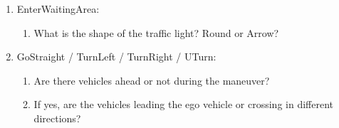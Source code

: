 \documentclass[lettersize,journal]{IEEEtran}
\begin{document}
\begin{enumerate}
    \item EnterWaitingArea:
    \begin{enumerate}
        \item What is the shape of the traffic light? Round or Arrow?
    \end{enumerate}

    \item GoStraight / TurnLeft / TurnRight / UTurn:
    \begin{enumerate}
        \item Are there vehicles ahead or not during the maneuver?
        \item If yes, are the vehicles leading the ego vehicle or crossing in different directions?
    \end{enumerate}
  
    \end{enumerate}

\balance


\end{document}
